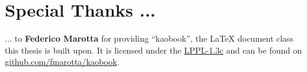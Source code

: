 \documentclass[
	fontsize=10pt, %
	twoside=false, %
	open=any, %
	numbers=noenddot, %
]{kaobook}
\begin{document}
\etocstandarddisplaystyle %
\etocstandardlines %

\tableofcontents %

\listoffigures %

\let\cleardoublepage\bigskip
\let\clearpage\bigskip

\listoftables %

\endgroup


\mainmatter %

%

%



\appendix %



\backmatter %

\chapter*{Special Thanks ...}

... to \textbf{Federico Marotta} for providing \enquote{kaobook}, the \LaTeX{} document class this thesis is built upon. It is licensed under the \href{https://www.latex-project.org/lppl/lppl-1-3c/}{LPPL-1.3c} and can be found on \href{https://github.com/fmarotta/kaobook}{github.com/fmarotta/kaobook}.
\end{document}
